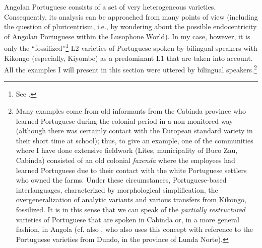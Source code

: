 \documentclass[output=paper,colorlinks,citecolor=brown]{langscibook}
\begin{document}
Angolan Portuguese consists of a set of very heterogeneous varieties. Consequently, its analysis can be approached from many points of view (including the question of pluricentrism, i.e., by wondering about the possible endocentricity of Angolan Portuguese within the Lusophone World). In my case, however, it is only the “fossilized”\footnote{See \citet[][82--86]{Roche2013, Selinker1972}.} L2 varieties of Portuguese spoken by bilingual speakers with Kikongo (especially, Kiyombe) as a predominant L1 that are taken into account. All the examples I will present in this section were uttered by bilingual speakers.\footnote{Many examples come from old informants from the Cabinda province who learned Portuguese during the colonial period in a non-monitored way (although there was certainly contact with the European standard variety in their short time at school); thus, to give an example, one of the communities where I have done extensive fieldwork (Lites, municipality of Buco Zau, Cabinda) consisted of an old colonial \textit{fazenda} where the employees had learned Portuguese due to their contact with the white Portuguese settlers who owned the farms. Under these circumstances, Portuguese-based interlanguages, characterized by morphological simplification, the overgeneralization of analytic variants and various transfers from Kikongo, fossilized. It is in this sense that we can speak of the \textit{partially restructured} varieties of Portuguese that are spoken in Cabinda or, in a more general fashion, in Angola (cf. also \citealt{Inverno2009}, who also uses this concept with reference to the Portuguese varieties from Dundo, in the province of Lunda Norte).}
\end{document}
